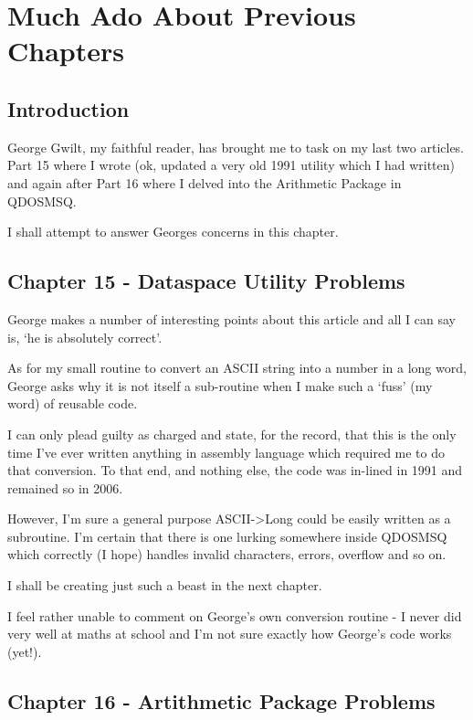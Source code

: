 \chapter{Much Ado About Previous Chapters}

\section{Introduction}
\label{ch17-intro}%

George Gwilt, my faithful reader, has brought me to task on my last
    two articles. Part 15 where I wrote (ok, updated a very old 1991 utility
    which I had written) and again after Part 16 where I delved into the
    Arithmetic Package in QDOSMSQ.

I shall attempt to answer Georges concerns in this chapter.

\section{Chapter 15 -{} Dataspace Utility Problems}
\label{ch17-dataspace}%

George makes a number of interesting points about this article and
    all I can say is, `he is absolutely correct'.

As for my small routine to convert an ASCII string into a number in
    a long word, George asks why it is not itself a sub-{}routine when I make
    such a `fuss' (my word) of reusable code.

I can only plead guilty as charged and state, for the record, that
    this is the only time I've ever written anything in assembly language
    which required me to do that conversion. To that end, and nothing else,
    the code was in-{}lined in 1991 and remained so in 2006.

However, I'm sure a general purpose ASCII-{}>{}Long could be easily
    written as a subroutine. I'm certain that there is one lurking somewhere
    inside QDOSMSQ which correctly (I hope) handles invalid characters,
    errors, overflow and so on.

I shall be creating just such a beast in the next chapter.

I feel rather unable to comment on George's own conversion routine -{}
    I never did very well at maths at school and I'm not sure exactly how
    George's code works (yet!).

\section{Chapter 16 -{} Artithmetic Package Problems}
\label{ch17-arithmetic}%

